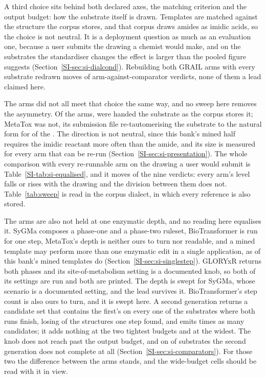 A third choice sits behind both declared axes, the matching criterion and the output budget:
how the substrate itself is drawn. Templates are matched against
the structure the corpus stores, and that corpus draws amides as imidic acids, so the choice is not
neutral. It is a deployment question as much as an evaluation one, because a user submits the drawing a chemist would make, and on the substrates the standardiser changes the effect is larger than the pooled figure suggests (Section~\ref{SI-sec:si-dialcond}).
Rebuilding both GRAIL arms with every substrate redrawn moves \numDsweepMoved{} of
\numDsweepCells{} arm-against-comparator verdicts, none of them a lead claimed here.

The arms did not all meet that choice the same way, and no sweep here removes the asymmetry.
Of the \numChemArmsWord{} arms, \numChemDrawnstoredWord{} were handed the substrate as the
corpus stores it; MetaTox was not, its submission file re-tautomerising the substrate to the
natural form for \numDialectMetatoxretaut{} of the \numDialectMetatoxn{}. The direction is not neutral, since this bank's mined half requires the imidic reactant more often than the amide, and its size is measured for every arm that can be re-run (Section~\ref{SI-sec:si-presentation}). The whole comparison with every re-runnable arm on the
drawing a user would submit is Table~\ref{SI-tab:si-equalised}, and it moves
\numEqualisedMovedWord{} of the nine verdicts: every arm's level falls or rises with the drawing and
the division between them does not. Table~\ref{tab:sweep} is read in the corpus dialect, in which
every reference is also stored.

The arms are also not held at one enzymatic depth, and no reading here equalises it. SyGMa composes
a phase-one and a phase-two ruleset, BioTransformer is run for one step, MetaTox's depth is neither
ours to turn nor readable, and a mined template may perform more than one enzymatic edit in a single
application, as \numCompositeUnionsharePct{} of this bank's mined templates do
(Section~\ref{SI-sec:si-singlestep}). GLORYxR returns both phases and its site-of-metabolism
setting is a documented knob, so both of its settings are run and both are printed. The depth is
swept for SyGMa, whose scenario is a documented setting, and the lead survives it. BioTransformer's
step count is also ours to turn, and it is swept here. A second generation returns a candidate set
that contains the first's on every one of the \numBtstepsPaired{} substrates where both runs
finish, losing \numBtstepsLostgenoneWord{} of the structures one step found, and emits
\numBtstepsRatio{} times as many candidates; it adds nothing at the two tightest budgets and
\numBtstepsGainfifty{} at the widest. The knob does not reach past the output budget, and on
\numBtstepsLost{} of \numBtstepsAttempted{} substrates the second generation does not complete at
all (Section~\ref{SI-sec:si-comparators}). For those two the difference between the arms stands, and the wide-budget cells should be read with it in view.

